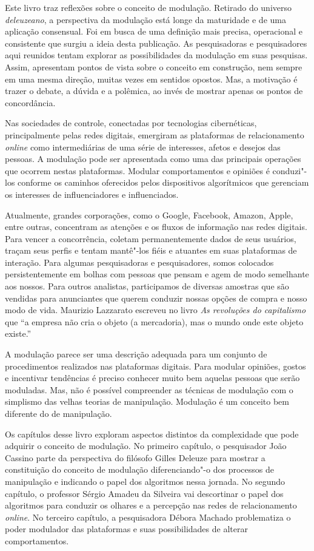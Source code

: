 \noindent{}Este livro traz reflexões sobre o conceito de modulação. Retirado do
universo \textit{deleuzeano}, a perspectiva da modulação está longe da maturidade
e de uma aplicação consensual. Foi em busca de uma definição mais
precisa, operacional e consistente que surgiu a ideia desta publicação.
As pesquisadoras e pesquisadores aqui reunidos tentam explorar as
possibilidades da modulação em suas pesquisas. Assim, apresentam pontos
de vista sobre o conceito em construção, nem sempre em uma mesma
direção, muitas vezes em sentidos opostos. Mas, a motivação é trazer o
debate, a dúvida e a polêmica, ao invés de mostrar apenas os pontos de
concordância.

Nas sociedades de controle, conectadas por tecnologias cibernéticas,
principalmente pelas redes digitais, emergiram as plataformas de
relacionamento \emph{online} como intermediárias de uma série de interesses,
afetos e desejos das pessoas. A modulação pode ser apresentada como uma
das principais operações que ocorrem nestas plataformas. Modular
comportamentos e opiniões é conduzi"-los conforme os caminhos oferecidos
pelos dispositivos algorítmicos que gerenciam os interesses de
influenciadores e influenciados.

Atualmente, grandes corporações, como o Google, Facebook, Amazon,
Apple, entre outras, concentram as atenções e os fluxos de informação
nas redes digitais. Para vencer a concorrência, coletam permanentemente
dados de seus usuários, traçam seus perfis e tentam mantê"-los fiéis e
atuantes em suas plataformas de interação. Para algumas pesquisadoras e pesquisadores,
somos colocados persistentemente em bolhas com pessoas que
pensam e agem de modo semelhante aos nossos. Para outros analistas, participamos de
diversas amostras que são vendidas para anunciantes que querem conduzir
nossas opções de compra e nosso modo de vida. Maurizio Lazzarato
escreveu no livro \emph{As revoluções do capitalismo} que ``a
empresa não cria o objeto (a mercadoria), mas o mundo onde este objeto existe.''

A modulação parece ser uma descrição adequada para um conjunto de
procedimentos realizados nas plataformas digitais. Para modular
opiniões, gostos e incentivar tendências é preciso conhecer muito bem
aquelas pessoas que serão moduladas. Mas, não é possível compreender as
técnicas de modulação com o simplismo das velhas teorias de manipulação.
Modulação é um conceito bem diferente do de manipulação.

Os capítulos desse livro exploram aspectos distintos da complexidade que
pode adquirir o conceito de modulação. No primeiro capítulo, o
pesquisador João Cassino parte da perspectiva do filósofo Gilles Deleuze
para mostrar a constituição do conceito de modulação diferenciando"-o dos
processos de manipulação e indicando o papel dos algoritmos nessa
jornada. No segundo capítulo, o professor Sérgio Amadeu da Silveira vai
descortinar o papel dos algoritmos para conduzir os olhares e a
percepção nas redes de relacionamento \emph{online}. No terceiro
capítulo, a pesquisadora Débora Machado problematiza o poder modulador
das plataformas e suas possibilidades de alterar comportamentos.

